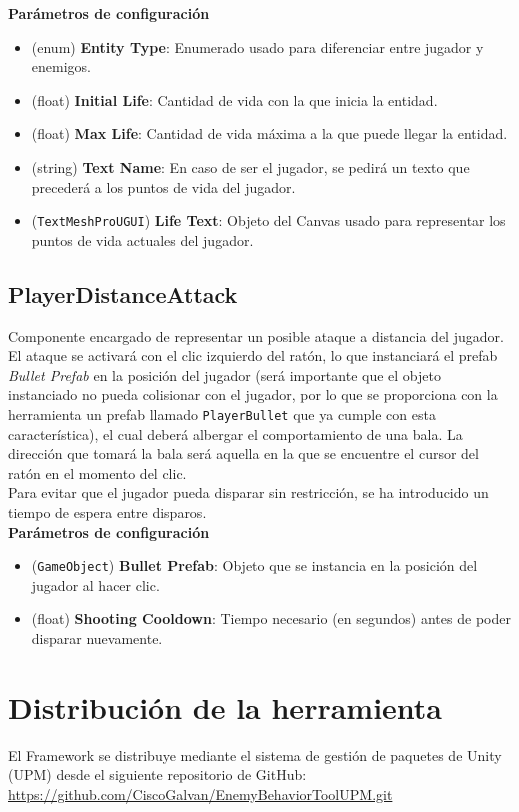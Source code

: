\textbf{Parámetros de configuración}
\begin{itemize}
	\item (enum) \textbf{Entity Type}: Enumerado usado para diferenciar entre jugador y enemigos.
	\item (float) \textbf{Initial Life}: Cantidad de vida con la que inicia la entidad.
	\item (float) \textbf{Max Life}: Cantidad de vida máxima a la que puede llegar la entidad.
	\item (string) \textbf{Text Name}: En caso de ser el jugador, se pedirá un texto que precederá a los puntos de vida del jugador.
	\item (\texttt{TextMeshProUGUI}) \textbf{Life Text}: Objeto del Canvas usado para representar los puntos de vida actuales del jugador.
\end{itemize}

\subsection{PlayerDistanceAttack}

Componente encargado de representar un posible ataque a distancia del jugador. El ataque se activará con el clic izquierdo del ratón, lo que instanciará el prefab \textit{Bullet Prefab} en la posición del jugador (será importante que el objeto instanciado no pueda colisionar con el jugador, por lo que se proporciona con la herramienta un prefab llamado \texttt{PlayerBullet} que ya cumple con esta característica), el cual deberá albergar el comportamiento de una bala. La dirección que tomará la bala será aquella en la que se encuentre el cursor del ratón en el momento del clic.\\

Para evitar que el jugador pueda disparar sin restricción, se ha introducido un tiempo de espera entre disparos.\\

\textbf{Parámetros de configuración}
\begin{itemize}
	\item (\texttt{GameObject}) \textbf{Bullet Prefab}: Objeto que se instancia en la posición del jugador al hacer clic.
	\item (float) \textbf{Shooting Cooldown}: Tiempo necesario (en segundos) antes de poder disparar nuevamente.
\end{itemize}

\section {Distribución de la herramienta}
El Framework se distribuye mediante el sistema de gestión de paquetes de Unity (UPM) desde el siguiente repositorio de GitHub:\\
\url{https://github.com/CiscoGalvan/EnemyBehaviorToolUPM.git}

